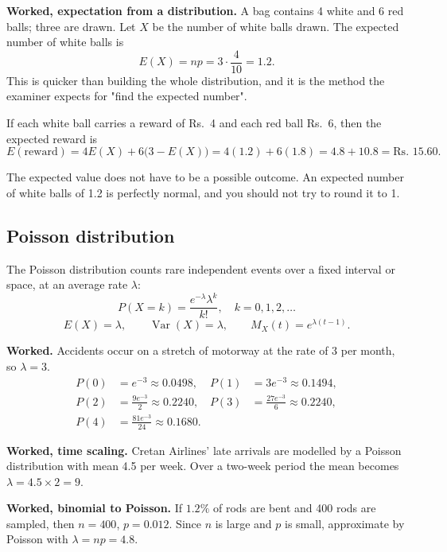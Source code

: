 \documentclass[11pt,a4paper]{article}
\begin{document}
\begin{exambox}
\textbf{Worked, expectation from a distribution.} A bag contains 4 white and 6 red balls; three are drawn. Let $X$ be the number of white balls drawn. The expected number of white balls is
\[
E(X)=np=3\cdot\frac4{10}=1.2.
\]
This is quicker than building the whole distribution, and it is the method the examiner expects for "find the expected number".

If each white ball carries a reward of Rs.\ 4 and each red ball Rs.\ 6, then the expected reward is
\[
E(\text{reward})=4E(X)+6\bigl(3-E(X)\bigr)=4(1.2)+6(1.8)=4.8+10.8=\boxed{\text{Rs.\ }15.60}.
\]
\end{exambox}

\begin{dangerbox}
The expected value does not have to be a possible outcome. An expected number of white balls of 1.2 is perfectly normal, and you should not try to round it to 1.
\end{dangerbox}

\subsection{Poisson distribution}
The Poisson distribution counts rare independent events over a fixed interval or space, at an average rate $\lambda$:
\[
\boxed{P(X=k)=\frac{e^{-\lambda}\lambda^k}{k!},\quad k=0,1,2,\dots}
\]
\[
E(X)=\lambda,\qquad \operatorname{Var}(X)=\lambda,\qquad M_X(t)=e^{\lambda(t-1)}.
\]

\begin{exambox}
\textbf{Worked.} Accidents occur on a stretch of motorway at the rate of 3 per month, so $\lambda=3$.
\begin{align*}
P(0)&=e^{-3}\approx0.0498, & P(1)&=3e^{-3}\approx0.1494,\\
P(2)&=\frac{9e^{-3}}{2}\approx0.2240, & P(3)&=\frac{27e^{-3}}{6}\approx0.2240,\\
P(4)&=\frac{81e^{-3}}{24}\approx0.1680.
\end{align*}
\end{exambox}

\begin{exambox}
\textbf{Worked, time scaling.} Cretan Airlines' late arrivals are modelled by a Poisson distribution with mean 4.5 per week. Over a two-week period the mean becomes $\lambda=4.5\times2=9$.

\textbf{Worked, binomial to Poisson.} If $1.2\%$ of rods are bent and 400 rods are sampled, then $n=400$, $p=0.012$. Since $n$ is large and $p$ is small, approximate by Poisson with $\lambda=np=4.8$.
\end{exambox}
\end{document}
